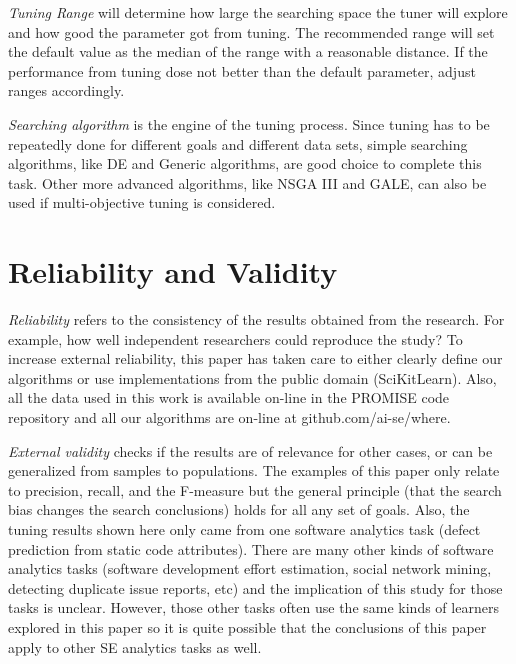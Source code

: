 \documentclass{sig-alternative}
\begin{document}
{\em Tuning Range} will determine how large the searching space the tuner will explore and how good the parameter got from tuning. The recommended range will set the default value as the median of the range with a reasonable distance. If the performance from tuning dose not better than the default parameter, adjust ranges accordingly.

{\em Searching algorithm} is the engine of the tuning process. Since tuning has to be repeatedly done for different goals and different data sets, simple searching algorithms, like DE and Generic algorithms, are good choice to complete this task. Other more advanced algorithms, like NSGA III \cite{deb2014evolutionary} and GALE\cite{krall15}, can also be used if multi-objective tuning is considered.


\section{Reliability and Validity}\label{sect:construct}


{\em Reliability} refers to the consistency of the results obtained
from the research.  For example,   how well independent researchers
could reproduce the study? To increase external
reliability, this paper has taken care to either  clearly define our
algorithms or use implementations from the public domain
(SciKitLearn). Also, all the data used in this work is available
on-line in the PROMISE code repository and all our algorithms
are on-line at github.com/ai-se/where.



{\em External validity} checks if the results are of relevance
for other cases, or can be generalized from samples
to populations.  
The examples of this paper  only relate to precision, recall, and the F-measure
but the general principle (that the search bias changes the search conclusions)  holds for all any set of goals. 
Also,
the tuning results shown here only came from one  software analytics task 
(defect prediction from static code attributes).
There are many other kinds of software analytics tasks 
(software development effort estimation, social network mining,
detecting duplicate issue reports, etc) and the implication of this
study for those tasks is unclear. 
However,  those other tasks often use the same kinds of learners
explored in this paper so it is quite possible that
the conclusions of this paper apply to other SE analytics tasks as well. 
\end{document}
